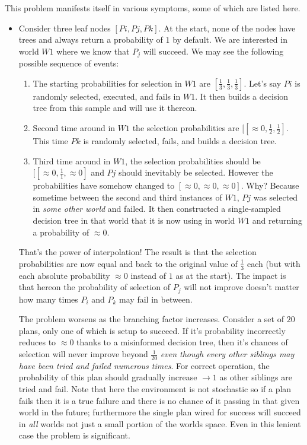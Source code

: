 \documentclass[a4paper]{article}
\newcommand{\dt}{{decision tree}\xspace}
\begin{document}
This problem manifests itself in various symptoms, some of which are listed here.
\begin{itemize}
\item Consider three leaf nodes $[Pi,Pj,Pk]$. At the start, none of the nodes have trees and always return a probability of $1$ by default. We are interested in world $W1$ where we know that $P_j$ will succeed. We may see the following possible sequence of events: 
\begin{enumerate}
\item The starting probabilities for selection in $W1$ are $[\frac{1}{3},\frac{1}{3},\frac{1}{3}]$. Let's say $Pi$ is randomly selected, executed, and fails in $W1$. It then builds a \dt from this sample and will use it thereon. 
\item Second time around in $W1$ the selection probabilities are $[[\approx0,\frac{1}{2},\frac{1}{2}]$. This time $Pk$ is randomly selected, fails, and builds a \dt.
\item Third time around in $W1$, the selection probabilities should be $[[\approx0,\frac{1}{1},\approx0]$ and $Pj$ should inevitably be selected. However the probabilities have somehow changed to $[\approx0, \approx0, \approx0]$. Why? Because sometime between the second and third instances of $W1$, $Pj$ was selected in \emph{some other world} and failed. It then constructed a single-sampled \dt in that world that it is now using in world $W1$ and returning a probability of $\approx0$. 
\end{enumerate}

That's the power of interpolation! The result is that the selection probabilities are now equal and back to the original value of $\frac{1}{3}$ each (but with each absolute probability $\approx 0$ instead of $1$ as at the start). The impact is that hereon the probability of selection of $P_j$ will not improve doesn't matter how many times $P_i$ and $P_k$ may fail in between. 

The problem worsens as the branching factor increases. Consider a set of $20$ plans, only one of which is setup to succeed. If it's probability incorrectly reduces to $\approx 0$ thanks to a misinformed \dt, then it's chances of selection will never improve beyond $\frac{1}{20}$ \emph{even though every other siblings may have been tried and failed numerous times}. For correct operation, the probability of this plan should gradually increase $\to1$ as other siblings are tried and fail. Note that here the environment is not stochastic so if a plan fails then it is a true failure and there is no chance of it passing in that given world in the future; furthermore the single plan wired for success will succeed in \textit{all} worlds not just a small portion of the worlds space. Even in this lenient case the problem is significant.


\end{itemize}
\end{document}
